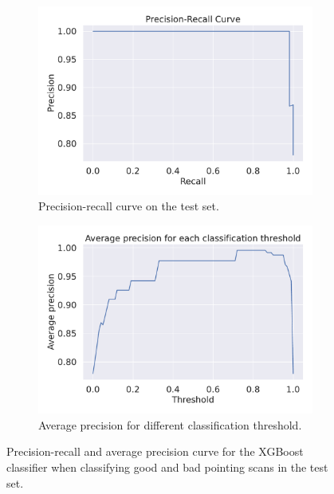 \begin{figure}[H]
    \centering
    \begin{subfigure}[t]{0.49\textwidth}
        \centering
        \includegraphics[width=1\textwidth]{Clf/precision_recall_curve_both.pdf}
        \caption{Precision-recall curve on the test set.}
        \label{subfig:pr_curve}
    \end{subfigure}
    \begin{subfigure}[t]{0.49\textwidth}
       \centering
       \includegraphics[width=1\textwidth]{Clf/mAP_curve_both.pdf}
       \caption{Average precision for different classification threshold.}
       \label{subfig:map_curve}
    \end{subfigure}
     \caption{Precision-recall and average precision curve for the XGBoost classifier when classifying good and bad pointing scans in the test set.}
     \label{fig:pointing_scan_clf}
\end{figure}



